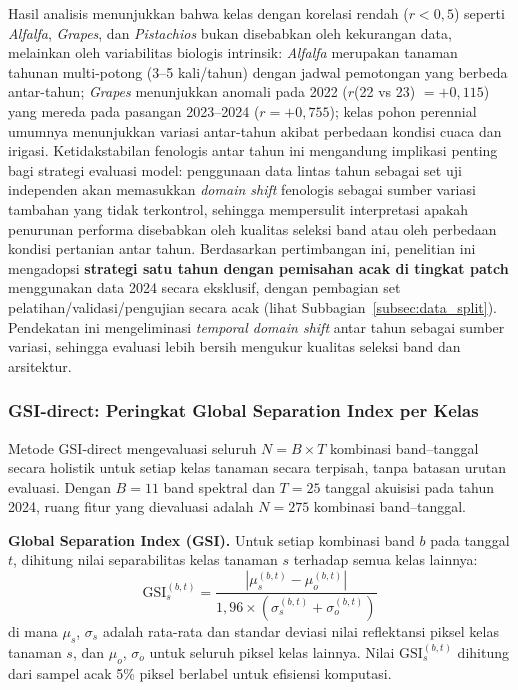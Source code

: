 Hasil analisis menunjukkan bahwa kelas dengan korelasi rendah ($r < 0{,}5$) seperti \textit{Alfalfa}, \textit{Grapes}, dan \textit{Pistachios} bukan disebabkan oleh kekurangan data, melainkan oleh variabilitas biologis intrinsik:
\textit{Alfalfa} merupakan tanaman tahunan multi-potong (3--5 kali/tahun) dengan jadwal pemotongan yang berbeda antar-tahun;
\textit{Grapes} menunjukkan anomali pada 2022 ($r$(22 vs 23) $= +0{,}115$) yang mereda pada pasangan 2023--2024 ($r = +0{,}755$);
kelas pohon perennial umumnya menunjukkan variasi antar-tahun akibat perbedaan kondisi cuaca dan irigasi.
Ketidakstabilan fenologis antar tahun ini mengandung implikasi penting bagi strategi evaluasi model: penggunaan data lintas tahun sebagai set uji independen akan memasukkan \textit{domain shift} fenologis sebagai sumber variasi tambahan yang tidak terkontrol, sehingga mempersulit interpretasi apakah penurunan performa disebabkan oleh kualitas seleksi band atau oleh perbedaan kondisi pertanian antar tahun.
Berdasarkan pertimbangan ini, penelitian ini mengadopsi \textbf{strategi satu tahun dengan pemisahan acak di tingkat patch} menggunakan data 2024 secara eksklusif, dengan pembagian set pelatihan/validasi/pengujian secara acak (lihat Subbagian~\ref{subsec:data_split}). Pendekatan ini mengeliminasi \textit{temporal domain shift} antar tahun sebagai sumber variasi, sehingga evaluasi lebih bersih mengukur kualitas seleksi band dan arsitektur.

\subsubsection{GSI-direct: Peringkat Global Separation Index per Kelas}
\label{subsubsec:gsi_direct}

Metode GSI-direct mengevaluasi seluruh $N = B \times T$ kombinasi band--tanggal secara holistik untuk setiap kelas tanaman secara terpisah, tanpa batasan urutan evaluasi.
Dengan $B = 11$ band spektral dan $T = 25$ tanggal akuisisi pada tahun 2024, ruang fitur yang dievaluasi adalah $N = 275$ kombinasi band--tanggal.

\textbf{Global Separation Index (GSI).}
Untuk setiap kombinasi band $b$ pada tanggal $t$, dihitung nilai separabilitas kelas tanaman $s$ terhadap semua kelas lainnya:
\begin{equation}
    \text{GSI}_{s}^{(b,t)} = \frac{|\mu_s^{(b,t)} - \mu_o^{(b,t)}|}{1{,}96 \times (\sigma_s^{(b,t)} + \sigma_o^{(b,t)})}
\end{equation}
di mana $\mu_s$, $\sigma_s$ adalah rata-rata dan standar deviasi nilai reflektansi piksel kelas tanaman $s$, dan $\mu_o$, $\sigma_o$ untuk seluruh piksel kelas lainnya.
Nilai $\text{GSI}_{s}^{(b,t)}$ dihitung dari sampel acak 5\% piksel berlabel untuk efisiensi komputasi.


